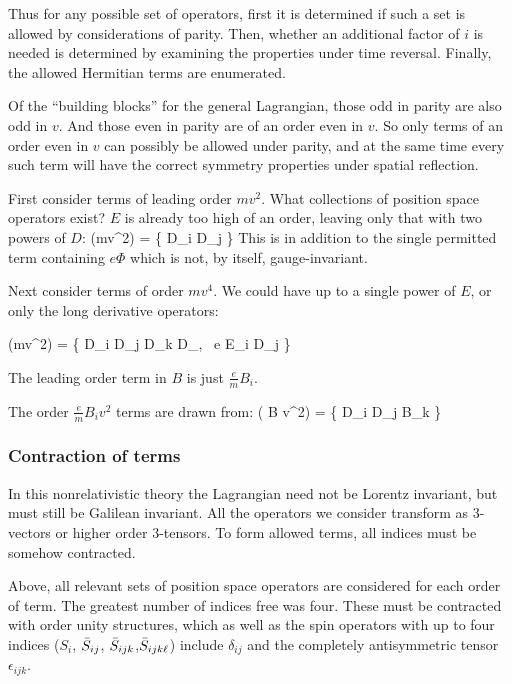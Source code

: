 Thus for any possible set of operators, first it is determined if such a set is allowed by considerations of parity.  Then, whether an additional factor of $i$ is needed is determined by examining the properties under time reversal.  Finally, the allowed Hermitian terms are enumerated.


Of the ``building blocks'' for the general Lagrangian, those odd in parity are also odd in $v$.  And those even in parity are of an order even in $v$.  So only terms of an order even in $v$ can possibly be allowed under parity, and at the same time every such term will have the correct symmetry properties under spatial reflection.

First consider terms of leading order $mv^2$.  What collections of position space operators exist?  $E$ is already too high of an order, leaving only that with two powers of $D$:
\beq
  (mv^2)  = \{  D_i D_j \} 
\eeq
This is in addition to the single permitted term containing $e\Phi$ which is not, by itself, gauge-invariant.
 
 Next consider terms of order $mv^4$.  We could have up to a single power of $E$, or only the long derivative operators:
 
\beq
  (mv^2)  = \{  D_i D_j D_k D_\ell, \,  e E_i D_j \} 
\eeq

The leading order term in $B$ is just $\frac{e}{m}B_i$.

The order $\frac{e}{m} B_i v^2$ terms are drawn from:
\beq
  ( B v^2)  = \{  D_i D_j B_k \}
\eeq


\subsubsection{Contraction of terms}

In this nonrelativistic theory the Lagrangian need not be Lorentz invariant, but must still be Galilean invariant.  All the operators we consider transform as 3-vectors or higher order 3-tensors.  To form allowed terms, all indices must be somehow contracted.

Above, all relevant sets of position space operators are considered for each order of term.  The greatest number of indices free was four.  These must be contracted with order unity structures, which as well as the spin operators with up to four indices ($S_i$, $\bar{S}_{ij}$, $\bar{S}_{ijk}$,$\bar{S}_{ijk\ell}$) include $\delta_{ij}$ and the completely antisymmetric tensor $\epsilon_{ijk}$.


